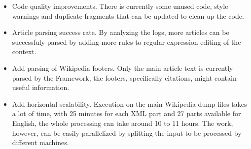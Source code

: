 \documentclass[thesis=M,english,hidelinks]{FITthesis}[2019/12/23]
\begin{document}
\begin{itemize}
	\item Code quality improvements. There is currently some unused code, style warnings and duplicate fragments that can be updated to clean up the code.
	\item Article parsing success rate. By analyzing the logs, more articles can be successfuly parsed by adding more rules to regular expression editing of the context.
	\item Add parsing of Wikipedia footers. Only the main article text is currently parsed by the Framework, the footers, specifically citations, might contain useful information.
	\item Add horizontal scalability. Execution on the main Wikipedia dump files takes a lot of time, with 25 minutes for each XML part and 27 parts available for English, the whole processing can take around 10 to 11 hours. The work, however, can be easily parallelized by splitting the input to be processed by different machines.
\end{itemize}

\printglossaries



\end{document}
